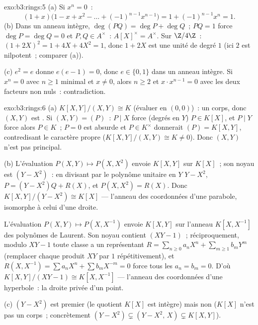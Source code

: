 \begin{solution}{exo:b3:rings:5}
(a) Si $x^n = 0$~:
\[
(1 + x)\bigl(1 - x + x^2 - \dots + (-1)^{n-1}x^{n-1}\bigr)
= 1 + (-1)^{n-1}x^n = 1 .
\]
(b) Dans un anneau intègre, $\deg(PQ) = \deg P + \deg Q$~; $PQ =
1$ force $\deg P = \deg Q = 0$ et $P, Q \in A^\times$~:
$A[X]^\times = A^\times$. Sur $\Z/4\Z$~: $(1 + 2X)^2 = 1 + 4X +
4X^2 = 1$, donc $1 + 2X$ est une unité de degré $1$ (ici $2$ est
nilpotent~; comparer (a)).

(c) $e^2 = e$ donne $e(e - 1) = 0$, donc $e \in \{0, 1\}$ dans un
anneau intègre. Si $x^n = 0$ avec $n \geq 1$ minimal et $x \ne
0$, alors $n \geq 2$ et $x \cdot x^{n-1} = 0$ avec les deux
facteurs non nuls~: contradiction.
\end{solution}

\begin{solution}{exo:b3:rings:6}
(a) $K[X,Y]/(X,Y) \cong K$ (évaluer en $(0,0)$)~: un corps, donc
$(X,Y)$ est . Si $(X, Y) = (P)$~: $P \mid X$ force (degrés
en $Y$) $P \in K[X]$, et $P \mid Y$ force alors $P \in K$~; $P =
0$ est absurde et $P \in K^\times$ donnerait $(P) = K[X,Y]$,
contredisant le caractère propre ($K[X,Y]/(X,Y) \cong K \neq
0$). Donc $(X,Y)$ n'est pas principal.

(b) L'évaluation $P(X, Y) \mapsto P(X, X^2)$ envoie $K[X,Y]$ sur
$K[X]$~; son noyau est $(Y - X^2)$~: en divisant par le polynôme
unitaire en $Y$ $Y - X^2$, $P = (Y - X^2)Q + R(X)$, et $P(X,
X^2) = R(X)$. Donc $K[X,Y]/(Y - X^2) \cong K[X]$ --- l'anneau
des coordonnées d'une parabole, isomorphe à celui d'une droite.

L'évaluation $P(X, Y) \mapsto P(X, X^{-1})$ envoie $K[X, Y]$ sur
l'anneau $K[X, X^{-1}]$ des polynômes de Laurent. Son noyau
contient $(XY - 1)$~; réciproquement, modulo $XY - 1$ toute
classe a un représentant $R = \sum_{n \geq 0} a_nX^n +
\sum_{m \geq 1} b_m Y^m$ (remplacer chaque produit $XY$ par $1$
répétitivement), et $R(X, X^{-1}) = \sum a_n X^n + \sum b_m
X^{-m} = 0$ force tous les $a_n = b_m = 0$. D'où $K[X, Y]/(XY -
1) \cong K[X, X^{-1}]$ --- l'anneau des coordonnées d'une
hyperbole~: la droite privée d'un point.

(c) $(Y - X^2)$ est premier (le quotient $K[X]$ est intègre) mais
non  ($K[X]$ n'est pas un corps~; concrètement $(Y - X^2)
\subsetneq (Y - X^2,\, X) \subsetneq K[X,Y]$).
\end{solution}

